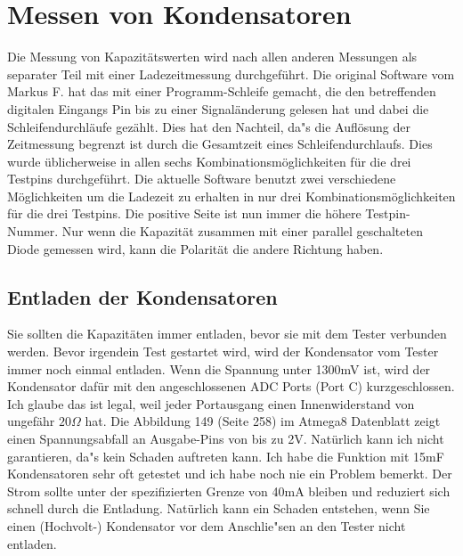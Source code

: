 \section{Messen von Kondensatoren}
Die Messung von Kapazit\"atswerten wird nach allen anderen Messungen als separater Teil mit einer Ladezeitmessung 
durchgef\"uhrt.
Die original Software vom Markus F. hat das mit einer Programm-Schleife gemacht, die den betreffenden digitalen
Eingangs Pin bis zu einer Signal\"anderung gelesen hat und dabei die Schleifendurchl\"aufe gez\"ahlt.
Dies hat den Nachteil, da"s die Aufl\"osung der Zeitmessung begrenzt ist durch die Gesamtzeit eines Schleifendurchlaufs.
Dies wurde \"ublicherweise in allen sechs Kombinationsm\"oglichkeiten f\"ur die drei Testpins durchgef\"uhrt.
Die aktuelle Software benutzt zwei verschiedene M\"oglichkeiten um die Ladezeit zu erhalten in nur drei
Kombinationsm\"oglichkeiten f\"ur die drei Testpins.
Die positive Seite ist nun immer die h\"ohere Testpin-Nummer.
Nur wenn die Kapazit\"at zusammen mit einer parallel geschalteten Diode gemessen wird,
kann die Polarit\"at die andere Richtung haben.

\subsection{Entladen der Kondensatoren}
Sie sollten die Kapazit\"aten immer entladen, bevor sie mit dem Tester verbunden werden.
Bevor irgendein Test gestartet wird, wird der Kondensator vom Tester immer noch einmal entladen.
Wenn die Spannung unter 1300mV ist, wird der Kondensator daf\"ur mit den angeschlossenen ADC Ports (Port C) kurzgeschlossen.
Ich glaube das ist legal, weil jeder Portausgang einen Innenwiderstand von ungef\"ahr \(20\Omega\) hat.
Die Abbildung 149 (Seite 258) im Atmega8 Datenblatt \cite{ATmega8} zeigt einen Spannungsabfall an Ausgabe-Pins von bis zu 2V.
Nat\"urlich kann ich nicht garantieren, da"s kein Schaden auftreten kann.
Ich habe die Funktion mit 15mF Kondensatoren sehr oft getestet und ich habe noch nie ein Problem bemerkt.
Der Strom sollte unter der spezifizierten Grenze von 40mA bleiben und reduziert sich schnell durch die Entladung.
Nat\"urlich kann ein Schaden entstehen, wenn Sie einen (Hochvolt-) Kondensator vor dem Anschlie"sen an den Tester nicht entladen.

